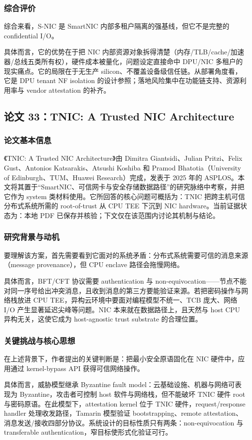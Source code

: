\documentclass[11pt]{ctexart}
\begin{document}
\subsubsection{综合评价}
综合来看，S-NIC 是 SmartNIC 内部多租户隔离的强基线，但它不是完整的 confidential I/O。\par
具体而言，它的优势在于把 NIC 内部资源对象拆得清楚（内存/TLB/cache/加速器/总线五类所有权），硬件成本被量化，问题设定直接命中 DPU/NIC 多租户的现实痛点。它的局限在于无生产 silicon、不覆盖设备级信任链。从部署角度看，它是 DPU tenant NF isolation 的设计参照；落地风险集中在功能链支持、资源利用率与 vendor attestation 的补齐。\par
\subsection{论文 33：TNIC: A Trusted NIC Architecture}
\subsubsection{论文基本信息}
《TNIC: A Trusted NIC Architecture》由 Dimitra Giantsidi、Julian Pritzi、Felix Gust、Antonios Katsarakis、Atsushi Koshiba 和 Pramod Bhatotia（University of Edinburgh、TUM、Huawei Research）完成，发表于 2025 年的 ASPLOS。本文将其置于“SmartNIC、可信网卡与安全存储数据路径”的研究脉络中考察，并把它作为 system 类材料使用。它所回答的核心问题可概括为：TNIC 把跨主机可信分布式系统所需的 root-of-trust 从 CPU TEE 下沉到 NIC hardware。当前证据状态为：本地 PDF 已保存并核验；下文仅在该范围内讨论其机制与结论。\cite{giantsidi2025tnic}\par
\subsubsection{研究背景与动机}
要理解该方案，首先需要看到它面对的系统矛盾：分布式系统需要可信的消息来源（message provenance），但 CPU enclave 路径会拖慢网络。\par
具体而言，BFT/CFT 协议需要 authentication 与 non-equivocation——节点不能对同一序号给出冲突消息，且收到消息的第三方要能验证来源。若把密码操作与网络栈放进 CPU TEE，异构云环境中要面对编程模型不统一、TCB 庞大、网络 I/O 产生显著延迟尖峰等问题。NIC 本来就在数据路径上，且天然与 host CPU 异构无关，这使它成为 host-agnostic trust substrate 的合理位置。\par
\subsubsection{关键挑战与核心思想}
在上述背景下，作者提出的关键判断是：把最小安全原语固化在 NIC 硬件中，应用通过 kernel-bypass API 获得可信网络操作。\par
具体而言，威胁模型继承 Byzantine fault model：云基础设施、机器与网络可表现为 Byzantine，攻击者可控制 host 软件与网络栈，但不能破坏 TNIC 硬件 root 与密码原语。在此模型下，attestation kernel 位于 TNIC 硬件，request/response handler 处理收发路径，Tamarin 模型验证 bootstrapping、remote attestation、消息发送/接收四部分协议。系统设计的目标性质只有两条：non-equivocation 与 transferable authentication，窄目标使形式化验证可行。\par
\end{document}
